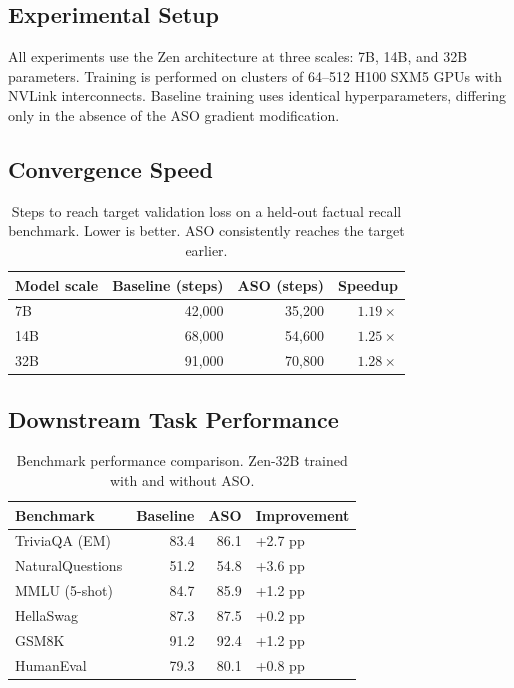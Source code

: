 \documentclass[11pt,a4paper]{article}
\begin{document}
\subsection{Experimental Setup}

All experiments use the Zen architecture at three scales: 7B, 14B, and 32B
parameters. Training is performed on clusters of 64--512 H100 SXM5 GPUs with NVLink
interconnects. Baseline training uses identical hyperparameters, differing only in the
absence of the ASO gradient modification.

\subsection{Convergence Speed}

\begin{table}[H]
\centering
\caption{Steps to reach target validation loss on a held-out factual recall benchmark.
Lower is better. ASO consistently reaches the target earlier.}
\begin{tabular}{lrrr}
\toprule
\textbf{Model scale} & \textbf{Baseline (steps)} & \textbf{ASO (steps)} & \textbf{Speedup} \\
\midrule
7B   & 42,000 & 35,200 & $1.19\times$ \\
14B  & 68,000 & 54,600 & $1.25\times$ \\
32B  & 91,000 & 70,800 & $1.28\times$ \\
\bottomrule
\end{tabular}
\label{tab:convergence}
\end{table}

\subsection{Downstream Task Performance}

\begin{table}[H]
\centering
\caption{Benchmark performance comparison. Zen-32B trained with and without ASO.}
\begin{tabular}{lrrl}
\toprule
\textbf{Benchmark} & \textbf{Baseline} & \textbf{ASO} & \textbf{Improvement} \\
\midrule
TriviaQA (EM)    & 83.4 & 86.1 & +2.7 pp \\
NaturalQuestions & 51.2 & 54.8 & +3.6 pp \\
MMLU (5-shot)    & 84.7 & 85.9 & +1.2 pp \\
HellaSwag        & 87.3 & 87.5 & +0.2 pp \\
GSM8K            & 91.2 & 92.4 & +1.2 pp \\
HumanEval        & 79.3 & 80.1 & +0.8 pp \\
\bottomrule
\end{tabular}
\label{tab:downstream}
\end{table}
\end{document}

